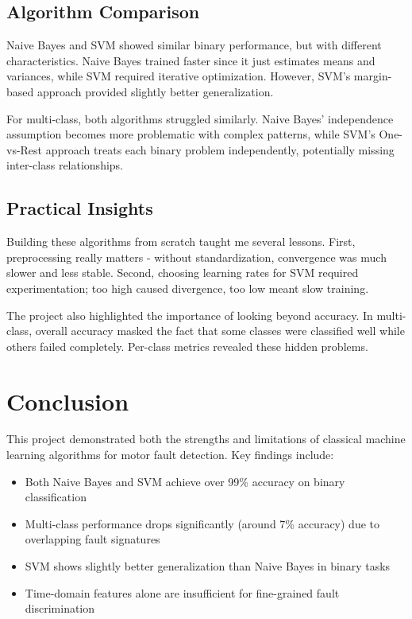 \documentclass[conference]{IEEEtran}
\begin{document}
\subsection{Algorithm Comparison}
Naive Bayes and SVM showed similar binary performance, but with different characteristics. Naive Bayes trained faster since it just estimates means and variances, while SVM required iterative optimization. However, SVM's margin-based approach provided slightly better generalization.

For multi-class, both algorithms struggled similarly. Naive Bayes' independence assumption becomes more problematic with complex patterns, while SVM's One-vs-Rest approach treats each binary problem independently, potentially missing inter-class relationships.

\subsection{Practical Insights}
Building these algorithms from scratch taught me several lessons. First, preprocessing really matters - without standardization, convergence was much slower and less stable. Second, choosing learning rates for SVM required experimentation; too high caused divergence, too low meant slow training.

The project also highlighted the importance of looking beyond accuracy. In multi-class, overall accuracy masked the fact that some classes were classified well while others failed completely. Per-class metrics revealed these hidden problems.

\section{Conclusion}

This project demonstrated both the strengths and limitations of classical machine learning algorithms for motor fault detection. Key findings include:

\begin{itemize}
\item Both Naive Bayes and SVM achieve over 99\% accuracy on binary classification
\item Multi-class performance drops significantly (around 7\% accuracy) due to overlapping fault signatures
\item SVM shows slightly better generalization than Naive Bayes in binary tasks
\item Time-domain features alone are insufficient for fine-grained fault discrimination
\end{itemize}
\end{document}
